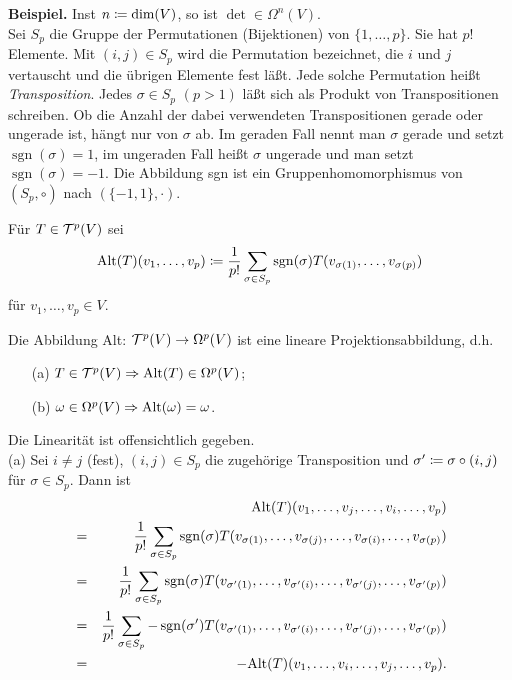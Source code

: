 \documentclass[a4paper,twoside,DIV15,BCOR12mm]{scrbook}
\DeclareMathOperator{\sgn}{sgn}
\begin{document}
\noindent
{\bf Beispiel.} Inst $n\da \text{dim}(V)$, so ist $\det\in\Omega^n(V)$.\\

\noindent
Sei $S_{p}$ die Gruppe der Permutationen (Bijektionen) von 
$\{1,\dots,p\}$. Sie hat $p!$ Elemente. Mit $(i,j) \in S_{p}$ wird die 
Permutation bezeichnet, die $i$ und $j$ vertauscht und die übrigen 
Elemente fest läßt. Jede solche Permutation heißt {\em 
Transposition}. Jedes $\sigma \in S_{p}$ $(p > 1)$ läßt sich als 
Produkt von Transpositionen schreiben. Ob die Anzahl der dabei 
verwendeten Transpositionen gerade oder ungerade ist, hängt nur von 
$\sigma$ ab. Im geraden Fall nennt man $\sigma$ gerade und setzt $\sgn(\sigma) = 1$, im ungeraden Fall heißt $\sigma$ ungerade und man 
setzt $\sgn (\sigma) = -1$. Die Abbildung sgn ist ein 
Gruppenhomomorphismus von $(S_{p},\circ)$ nach $(\{-1,1\},\cdot)$.

\bigskip

 Für $T \in {\cal T}^{p}(V)$ sei
\[ {\rm Alt}(T)(v_{1},\dots,v_{p}) \da  \frac{1}{p!} \sum_{\sigma \in 
S_{p}} \sgn (\sigma) T(v_{\sigma(1)},\dots,v_{\sigma(p)}) \]
für $v_1,\ldots,v_p\in V$.\\

\bigskip

\begin{satz}\label{Satz3.3.2} {Die Abbildung {\rm Alt}: ${\cal T}^{p}(V) 
\to \Omega^{p}(V)$ ist eine lineare Projektionsabbildung, d.h.}
\begin{enumerate}
\item[{\rm (a)}] $T \in {\cal T}^{p}(V) \Rightarrow {\rm Alt}(T) \in 
\Omega^{p}(V)$;
\item[{\rm (b)}] $\omega \in \Omega^{p}(V) \Rightarrow {\rm Alt}(\omega) = \omega$.
\end{enumerate}
\end{satz}

\bigskip

 Die Linearität ist offensichtlich gegeben.\\

\noindent
(a) Sei $i \not= j$ (fest), $(i,j) \in S_{p}$ die zugehörige 
Transposition und $\sigma' \da  \sigma \circ (i,j)$ für $\sigma \in 
S_{p}$. Dann ist
\begin{eqnarray*} 
&   & {\rm Alt}(T) (v_{1},\dots,v_{j},\dots,v_{i},\dots,v_{p}) \\
& = & \frac{1}{p!} \sum_{\sigma \in S_{p}} \sgn (\sigma) 
T(v_{\sigma(1)},\dots,v_{\sigma(j)},\dots,v_{\sigma(i)},\dots,v_{\sigma(p)}) \\
& = & \frac{1}{p!} \sum_{\sigma \in S_{p}} \sgn (\sigma) 
T(v_{\sigma'(1)},\dots,v_{\sigma'(i)},\dots,v_{\sigma'(j)},
\dots,v_{\sigma'(p)}) \\
& = & \frac{1}{p!} \sum_{\sigma \in S_{p}} - \sgn (\sigma') 
T(v_{\sigma'(1)},\dots,v_{\sigma'(i)},
\dots,v_{\sigma'(j)},\dots,v_{\sigma'(p)}) \\
& = & -{\rm Alt}(T)(v_{1},\dots,v_{i},\dots,v_{j},\dots,v_{p}).
\end{eqnarray*}
\end{document}

